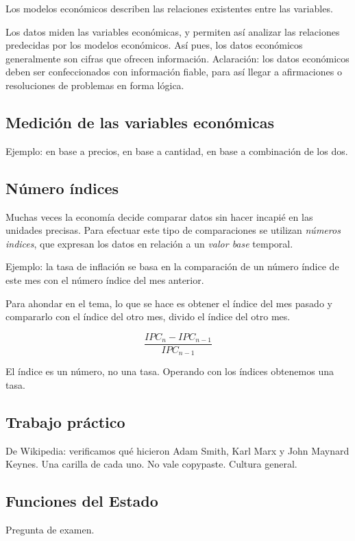 Los modelos económicos describen las relaciones existentes entre las variables.

Los datos miden las variables económicas,
y permiten así analizar las relaciones predecidas por los modelos económicos.
Así pues,
los datos económicos generalmente son cifras que ofrecen información.
Aclaración: los datos económicos deben ser confeccionados con información fiable,
para así llegar a afirmaciones o resoluciones de problemas en forma lógica.

\subsection{Medición de las variables económicas}

Ejemplo: en base a precios,
en base a cantidad,
en base a combinación de los dos.

\subsection{Número índices}

Muchas veces la economía decide comparar datos sin hacer incapié en las unidades precisas.
Para efectuar este tipo de comparaciones se utilizan \textit{números indices},
que expresan los datos en relación a un \textit{valor base} temporal.

Ejemplo: la tasa de inflación se basa en la comparación de un número índice de este mes con 
el número índice del mes anterior.

Para ahondar en el tema, lo que se hace es 
obtener el índice del mes pasado y compararlo con el índice del otro mes,
divido el índice del otro mes.

\begin{equation*}
    \frac{IPC_{n} - IPC_{n-1}}{IPC_{n-1}}
\end{equation*}

El índice es un número, no una tasa.
Operando con los índices obtenemos una tasa.

\subsection{Trabajo práctico}

De Wikipedia: verificamos qué hicieron Adam Smith, Karl Marx y John Maynard Keynes.
Una carilla de cada uno. No vale copypaste. Cultura general.

\subsection{Funciones del Estado}

Pregunta de examen.